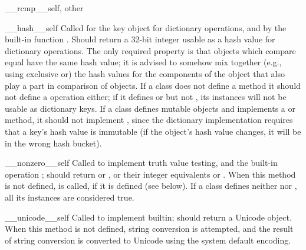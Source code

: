 \begin{methoddesc}[object]{__rcmp__}{self, other}
\end{methoddesc}

\begin{methoddesc}[object]{__hash__}{self}
Called for the key object for dictionary 
operations, and by the built-in function
.  Should return a 32-bit integer
usable as a hash value
for dictionary operations.  The only required property is that objects
which compare equal have the same hash value; it is advised to somehow
mix together (e.g., using exclusive or) the hash values for the
components of the object that also play a part in comparison of
objects.  If a class does not define a  method it should
not define a  operation either; if it defines
 or  but not ,
its instances will not be usable as dictionary keys.  If a class
defines mutable objects and implements a  or
 method, it should not implement ,
since the dictionary implementation requires that a key's hash value
is immutable (if the object's hash value changes, it will be in the
wrong hash bucket).


\end{methoddesc}

\begin{methoddesc}[object]{__nonzero__}{self}
Called to implement truth value testing, and the built-in operation
; should return  or , or their
integer equivalents  or .
When this method is not defined,  is
called, if it is defined (see below).  If a class defines neither
 nor , all its instances are
considered true.
\end{methoddesc}

\begin{methoddesc}[object]{__unicode__}{self}
Called to implement  builtin;
should return a Unicode object. When this method is not defined, string
conversion is attempted, and the result of string conversion is converted
to Unicode using the system default encoding.
\end{methoddesc}


